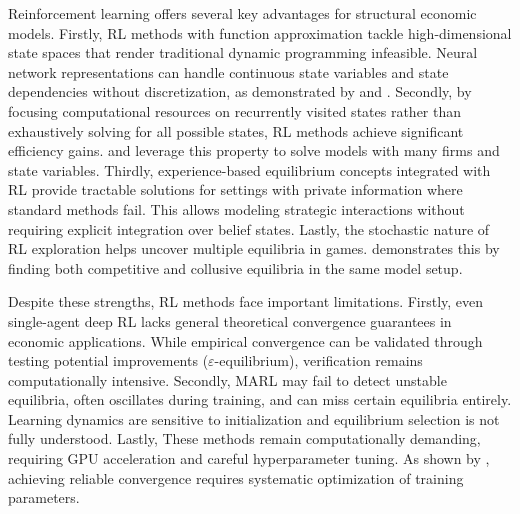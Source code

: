 Reinforcement learning offers several key advantages for structural economic models. Firstly, RL methods with function approximation tackle high-dimensional state spaces that render traditional dynamic programming infeasible. Neural network representations can handle continuous state variables and state dependencies without discretization, as demonstrated by \citet{Covarrubias2022} and \citet{curry2022}. Secondly, by focusing computational resources on recurrently visited states rather than exhaustively solving for all possible states, RL methods achieve significant efficiency gains. \citet{FershtmanPakes2012} and \citet{Hollenbeck2019} leverage this property to solve models with many firms and state variables. Thirdly, experience-based equilibrium concepts integrated with RL provide tractable solutions for settings with private information where standard methods fail. This allows modeling strategic interactions without requiring explicit integration over belief states. Lastly, the stochastic nature of RL exploration helps uncover multiple equilibria in games. \citet{Covarrubias2022} demonstrates this by finding both competitive and collusive equilibria in the same model setup.

Despite these strengths, RL methods face important limitations. Firstly, even single-agent deep RL lacks general theoretical convergence guarantees in economic applications. While empirical convergence can be validated through testing potential improvements ($\varepsilon$-equilibrium), verification remains computationally intensive. Secondly, MARL may fail to detect unstable equilibria, often oscillates during training, and can miss certain equilibria entirely. Learning dynamics are sensitive to initialization and equilibrium selection is not fully understood. Lastly, These methods remain computationally demanding, requiring GPU acceleration and careful hyperparameter tuning. As shown by \citet{GrafEtAl2024}, achieving reliable convergence requires systematic optimization of training parameters.
